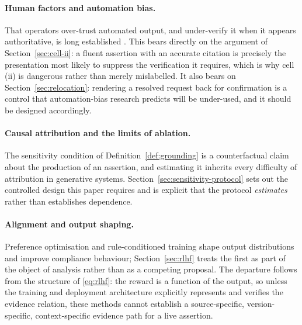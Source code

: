 \paragraph{Human factors and automation bias.} That operators over-trust automated
output, and under-verify it when it appears authoritative, is long established
\citep{parasuraman1997,skitka1999}. This bears directly on the argument of
Section~\ref{sec:cell-ii}: a fluent assertion with an accurate citation is precisely
the presentation most likely to suppress the verification it requires, which is why
cell (ii) is dangerous rather than merely mislabelled. It also bears on
Section~\ref{sec:relocation}: rendering a resolved request back for confirmation is a
control that automation-bias research predicts will be under-used, and it should be
designed accordingly.

\paragraph{Causal attribution and the limits of ablation.} The
sensitivity condition of Definition~\ref{def:grounding} is a counterfactual claim
about the production of an assertion, and estimating it inherits every difficulty of
attribution in generative systems. Section~\ref{sec:sensitivity-protocol} sets out the
controlled design this paper requires and is explicit that the protocol
\emph{estimates} rather than establishes dependence.

\paragraph{Alignment and output shaping.} Preference optimisation
\citep{ouyang2022} and rule-conditioned training \citep{bai2022} shape output
distributions and improve compliance behaviour; Section~\ref{sec:rlhf} treats the
first as part of the object of analysis rather than as a competing proposal. The
departure follows from the structure of \eqref{eq:rlhf}: the reward is a function of
the output, so unless the training and deployment architecture explicitly represents
and verifies the evidence relation, these methods cannot establish a source-specific,
version-specific, context-specific evidence path for a live assertion.
